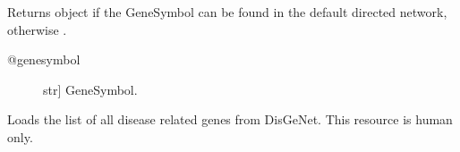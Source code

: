 \documentclass[letterpaper,10pt,english]{sphinxmanual}
\begin{document}
\begin{fulllineitems}
\begin{fulllineitems}
\begin{description}
\end{description}

\end{fulllineitems}


\begin{fulllineitems}
\label{\detokenize{main:pypath.main.PyPath.dgenesymbols}}
\end{fulllineitems}


\begin{fulllineitems}
\label{\detokenize{main:pypath.main.PyPath.dgs}}
Returns  object if the GeneSymbol
can be found in the default directed network,
otherwise .
\begin{description}
\item[{@genesymbol}] \leavevmode{[}str{]}
GeneSymbol.

\end{description}

\end{fulllineitems}


\begin{fulllineitems}
\label{\detokenize{main:pypath.main.PyPath.dgss}}
\end{fulllineitems}


\begin{fulllineitems}
\label{\detokenize{main:pypath.main.PyPath.disease_genes_list}}
Loads the list of all disease related genes from DisGeNet. This
resource is human only.

\end{fulllineitems}


\begin{fulllineitems}
\label{\detokenize{main:pypath.main.PyPath.dneighbors}}
\end{fulllineitems}


\end{fulllineitems}
\end{document}
